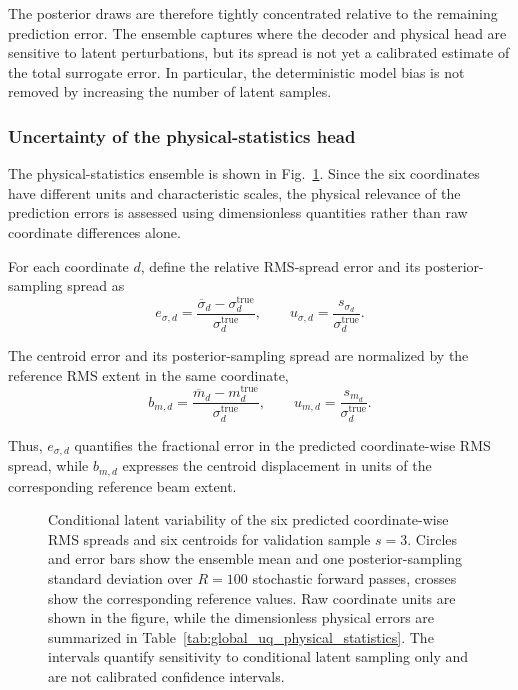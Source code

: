 The posterior draws are therefore tightly concentrated relative to the remaining prediction error. The ensemble captures where the decoder and physical head are sensitive to latent perturbations, but its spread is not yet a calibrated estimate of the total surrogate error. In particular, the deterministic model bias is not removed by increasing the number of latent samples.

\subsubsection{Uncertainty of the physical-statistics head}
\label{subsubsec:uq_physical_statistics_results}

The physical-statistics ensemble is shown in Fig.~\ref{fig:global_uq_moments}. Since the six coordinates have different units and characteristic scales, the physical relevance of the prediction errors is assessed using dimensionless quantities rather than raw coordinate differences alone.

For each coordinate \(d\), define the relative RMS-spread error and its posterior-sampling spread as
\begin{equation}
    e_{\sigma,d}
    =
    \frac{
        \overline{\sigma}_d
        -
        \sigma_d^{\mathrm{true}}
    }{
        \sigma_d^{\mathrm{true}}
    },
    \qquad
    u_{\sigma,d}
    =
    \frac{
        s_{\sigma_d}
    }{
        \sigma_d^{\mathrm{true}}
    }.
\end{equation}

The centroid error and its posterior-sampling spread are normalized by the reference RMS extent in the same coordinate,
\begin{equation}
    b_{m,d}
    =
    \frac{
        \overline{m}_d
        -
        m_d^{\mathrm{true}}
    }{
        \sigma_d^{\mathrm{true}}
    },
    \qquad
    u_{m,d}
    =
    \frac{
        s_{m_d}
    }{
        \sigma_d^{\mathrm{true}}
    }.
\end{equation}
    
Thus, \(e_{\sigma,d}\) quantifies the fractional error in the predicted coordinate-wise RMS spread, while \(b_{m,d}\)  expresses the centroid displacement in units of the corresponding reference beam extent.

\begin{figure}[h!]
\centering
{}
\caption{
Conditional latent variability of the six predicted coordinate-wise RMS spreads and six centroids for validation sample \(s=3\). Circles and error bars show the ensemble mean and one posterior-sampling standard deviation over \(R=100\) stochastic forward passes, crosses show the corresponding reference values. Raw coordinate units are shown in the figure, while the dimensionless physical errors are summarized in Table~\ref{tab:global_uq_physical_statistics}. The intervals quantify sensitivity to conditional latent sampling only and are not calibrated confidence intervals.}
\label{fig:global_uq_moments}
\end{figure}

